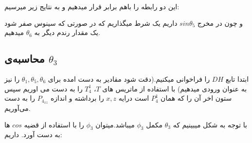 \documentclass{article}
\begin{document}
\noindent
این دو رابطه را باهم برابر قرار میدهیم و به نتایج زیر میرسیم:
\begin{figure}[H]%
	\centering
    \caption{\label{fig:formula213}}
\end{figure}
\noindent
و چون در مخرج $sin \theta_5$ داریم یک شرط میگذاریم که در صورتی که سینوس صفر شود یک مقدار رندم دیگر به $\theta_6$ میدهیم.


\subsection{محاسبه‌ی $\theta_3$}
ابتدا تابع $DH$ را فراخوانی میکنیم.(دقت شود مقادیر به دست امده برای $\theta_1, \theta_5, \theta_6$ را نیز به عنوان ورودی میدهیم)
با استفاده از ماتریس های $T$، $T_4^1$ را به دست می اوریم سپس ستون اخر آن را که همان $P_4^1$ است درایه $x, z$ را برداشته و اندازه $P_{4_{xz}}$ را به دست  می‌آوریم.
\begin{figure}[H]%
	\centering
    \caption{\label{fig:formula216}}
\end{figure}
\noindent
با توجه به شکل میبینیم که $\theta_3$  مکمل $\phi_3$ میباشد.میتوان $\phi_3$ را با استفاده از قضیه $cos$ ها به دست آورد. داریم:
\begin{figure}[H]%
	\centering
    \\
    \\
    \caption{\label{fig:formula220}}
\end{figure}
\end{document}
